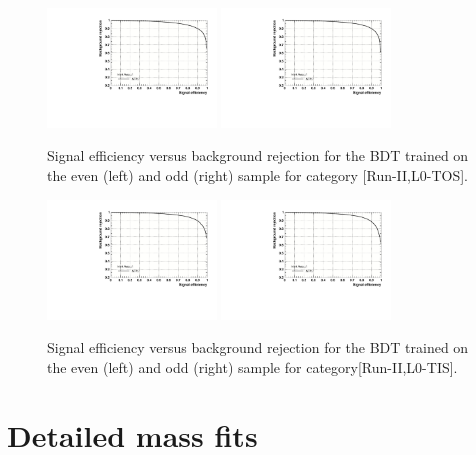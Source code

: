 \begin{figure}[h]
\includegraphics[height=!,width=0.4\textwidth]{figs/TMVA/BDTG_Data_run2_t0_even/rejBvsS.pdf}
\includegraphics[height=!,width=0.4\textwidth]{figs/TMVA/BDTG_Data_run2_t0_odd/rejBvsS.pdf}
\caption{Signal efficiency versus background rejection for the BDT trained on the even (left) and odd (right) sample for category [Run-II,\textsf{L0-TOS}].}

\includegraphics[height=!,width=0.4\textwidth]{figs/TMVA/BDTG_Data_run2_t1_even/rejBvsS.pdf}
\includegraphics[height=!,width=0.4\textwidth]{figs/TMVA/BDTG_Data_run2_t1_odd/rejBvsS.pdf}
\caption{Signal efficiency versus background rejection for the BDT trained on the even (left) and odd (right) sample for category[Run-II,\textsf{L0-TIS}].}
\end{figure}


\clearpage
\section{Detailed mass fits}
\label{sec:DetailedMassfits}

